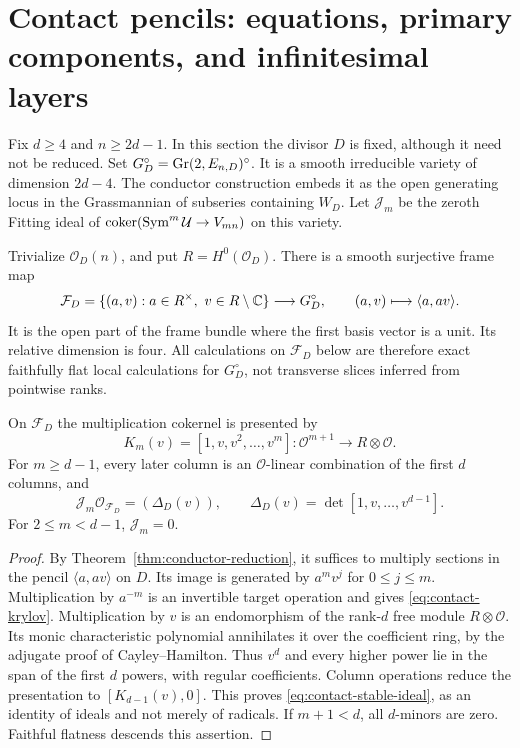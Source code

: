 \section{Contact pencils: equations, primary components, and infinitesimal layers}
\label{sec:contact-primary-structure}
Fix $d\ge4$ and $n\ge2d-1$. In this section the divisor $D$ is
fixed, although it need not be reduced. Set
$G_D^\circ=\operatorname{Gr}(2,E_{n,D})^\circ$. It is a smooth irreducible variety
of dimension $2d-4$. The conductor construction embeds it as the
open generating locus in the Grassmannian of subseries containing
$W_D$. Let $\mathcal J_m$ be the zeroth Fitting ideal of
$\operatorname{coker}(\operatorname{Sym}^m\mathcal U\to V_{mn})$ on this variety.

Trivialize $\mathcal O_D(n)$, and put $R=H^0(\mathcal O_D)$.
There is a smooth surjective frame map
\begin{equation}\label{eq:contact-frame}
 \mathcal F_D=\{(a,v):a\in R^\times,\ v\in R\setminus\mathbb C\}
 \longrightarrow G_D^\circ,\qquad (a,v)\longmapsto\langle a,av\rangle.
\end{equation}
It is the open part of the frame bundle where the first basis vector
is a unit. Its relative dimension is four. All calculations on
$\mathcal F_D$ below are therefore exact faithfully flat local
calculations for $G_D^\circ$, not transverse slices inferred from
pointwise ranks.

\begin{lemma}\label{lem:contact-power-basis}
On $\mathcal F_D$ the multiplication cokernel is presented by
\begin{equation}\label{eq:contact-krylov}
 K_m(v)=[1,v,v^2,\ldots,v^m]:\mathcal O^{m+1}
                              \longrightarrow R\otimes\mathcal O.
\end{equation}
For $m\ge d-1$, every later column is an $\mathcal O$-linear
combination of the first $d$ columns, and
\begin{equation}\label{eq:contact-stable-ideal}
 \mathcal J_m\mathcal O_{\mathcal F_D}=(\Delta_D(v)),\qquad
 \Delta_D(v)=\det[1,v,\ldots,v^{d-1}].
\end{equation}
For $2\le m<d-1$, $\mathcal J_m=0$.
\end{lemma}
\begin{proof}
By Theorem~\ref{thm:conductor-reduction}, it suffices to multiply
sections in the pencil $\langle a,av\rangle$ on $D$. Its image
is generated by $a^m v^j$ for $0\le j\le m$. Multiplication by
$a^{-m}$ is an invertible target operation and gives
\eqref{eq:contact-krylov}. Multiplication by $v$ is an endomorphism
of the rank-$d$ free module $R\otimes\mathcal O$. Its monic
characteristic polynomial annihilates it over the coefficient ring,
by the adjugate proof of Cayley--Hamilton. Thus $v^d$ and every
higher power lie in the span of the first $d$ powers, with regular
coefficients. Column operations reduce the presentation to
$[K_{d-1}(v),0]$. This proves \eqref{eq:contact-stable-ideal}, as an
identity of ideals and not merely of radicals. If $m+1<d$, all
$d$-minors are zero. Faithful flatness descends this assertion.
\end{proof}

